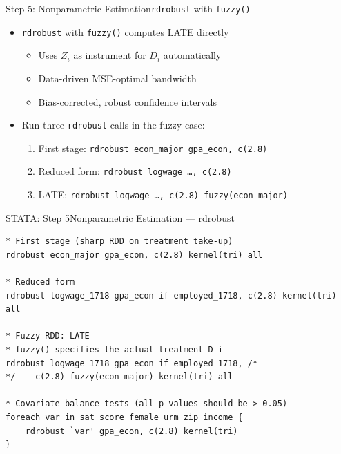 \documentclass[hyperref={pdfpagelabels=false}]{beamer}
\begin{document}
\begin{frame}{Step 5: Nonparametric Estimation}{\texttt{rdrobust} with \texttt{fuzzy()}}
	\begin{itemize}
		\item \texttt{rdrobust} with \texttt{fuzzy()} computes LATE directly
		\begin{itemize}
			\vspace{0.2cm}
			\item Uses $Z_i$ as instrument for $D_i$ automatically
			\vspace{0.2cm}
			\item Data-driven MSE-optimal bandwidth
			\vspace{0.2cm}
			\item Bias-corrected, robust confidence intervals
		\end{itemize}
		\vspace{0.2cm}
		\item Run three \texttt{rdrobust} calls in the fuzzy case:
		\begin{enumerate}
			\vspace{0.2cm}
			\item First stage: \texttt{rdrobust econ\_major gpa\_econ, c(2.8)}
			\vspace{0.2cm}
			\item Reduced form: \texttt{rdrobust logwage \ldots, c(2.8)}
			\vspace{0.2cm}
			\item LATE: \texttt{rdrobust logwage \ldots, c(2.8) fuzzy(econ\_major)}
		\end{enumerate}
	\end{itemize}
\end{frame}


\begin{frame}[fragile]{STATA: Step 5}{Nonparametric Estimation --- rdrobust}
\begin{lstlisting}
* First stage (sharp RDD on treatment take-up)
rdrobust econ_major gpa_econ, c(2.8) kernel(tri) all

* Reduced form
rdrobust logwage_1718 gpa_econ if employed_1718, c(2.8) kernel(tri) all

* Fuzzy RDD: LATE
* fuzzy() specifies the actual treatment D_i
rdrobust logwage_1718 gpa_econ if employed_1718, /*
*/    c(2.8) fuzzy(econ_major) kernel(tri) all

* Covariate balance tests (all p-values should be > 0.05)
foreach var in sat_score female urm zip_income {
    rdrobust `var' gpa_econ, c(2.8) kernel(tri)
}
\end{lstlisting}
\end{frame}
\end{document}
